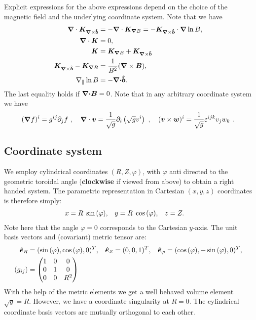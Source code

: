 Explicit expressions for the above expressions
depend on the choice of the magnetic field and the underlying coordinate system.
Note that we have
\begin{align}
    {\boldsymbol{\nabla}}\cdot {{\boldsymbol{K}}_{{\boldsymbol{\nabla}}\times\bm{\hat{b}}}}
&= -{\boldsymbol{\nabla}}\cdot {{\boldsymbol{K}}_{{\boldsymbol{\nabla}}B}} = -{{\boldsymbol{K}}_{{\boldsymbol{\nabla}}\times\bm{\hat{b}}}}\cdot{\boldsymbol{\nabla}}\ln B, \\
    {\boldsymbol{\nabla}}\cdot{\boldsymbol{ K}} &= 0, \\
    {\boldsymbol{K}} &= {{\boldsymbol{K}}_{{\boldsymbol{\nabla}} B}} + {{\boldsymbol{K}}_{{\boldsymbol{\nabla}}\times\bm{\hat{b}}}} \\
    {{\boldsymbol{K}}_{{\boldsymbol{\nabla}}\times\bm{\hat{b}}}} - {{\boldsymbol{K}}_{{\boldsymbol{\nabla}} B}} &= \frac{1}{B^2} ({\boldsymbol{\nabla}} \times {\boldsymbol{B}}), \\
    \nabla_\parallel \ln B &= -{\boldsymbol{{\boldsymbol{\nabla}}\cdot}}\bm{\hat{b}}.
    \label{eq:curl_curvature}
\end{align}
The last equality holds if ${\boldsymbol{{\boldsymbol{\nabla}}\cdot}} {\boldsymbol{B}} = 0$.
Note that in any arbitrary coordinate system we have
\begin{align}
({\boldsymbol{\nabla}} f)^i = g^{ij}\partial_j f ~, \quad
{\boldsymbol{\nabla}}\cdot {\boldsymbol{v}} = \frac{1}{\sqrt{g}}\partial_i \left(\sqrt{g} v^i\right) ~, \quad
({\boldsymbol{v}} \times {\boldsymbol{w}})^i = \frac{1}{\sqrt{g}}\varepsilon^{ijk} v_jw_k ~.
\end{align}

\subsection{Coordinate system}\label{sec:cylmetric}
We employ cylindrical coordinates \( (R,Z,\varphi) \), with \(\varphi\) anti directed to the geometric toroidal angle ({\bf clockwise} if viewed from above) to
obtain a right handed system. The parametric representation in Cartesian \((x,y,z)\) coordinates is therefore simply:
\begin{align}
 x &= R \hspace{1 mm} \sin{(\varphi)}, &
 y &= R \hspace{1 mm} \cos{(\varphi)}, &
 z &= Z .
\end{align}
Note here that the angle $\varphi = 0$ corresponds to the Cartesian $y$-axis.
The unit
basis vectors and (covariant) metric tensor are:
\begin{align}
 \bm{\hat{e}}_R      &= (\sin{(\varphi)} ,   \cos{(\varphi)},0)^T, &
 \bm{\hat{e}}_Z      &= ( 0 ,0 ,1 )^T, &
 \bm{\hat{e}}_{\varphi} &= ( \cos{(\varphi)} , -\sin{(\varphi)} , 0 )^T,
\\
    (g_{ij}) &= \begin{pmatrix}
  1 & 0 & 0 \\
  0 & 1 & 0 \\
  0 & 0 & R^2
   \end{pmatrix}
\end{align}
With the help of the metric elements we get a well behaved volume element \(\sqrt{g} = R\). However, we have a coordinate singularity at \(R=0\).
The cylindrical coordinate basis vectors are mutually orthogonal to each other.

